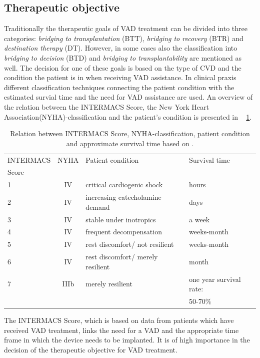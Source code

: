 \subsection{Therapeutic objective}
Traditionally the therapeutic goals of VAD treatment can be divided into three categories: \textit{bridging to transplantation} (BTT), \textit{bridging to recovery} (BTR) and \textit{destination therapy} (DT). However, in some cases also the classification into \textit{bridging to decision} (BTD) and \textit{bridging to transplantability} are mentioned as well. The decision for one of these goals is based on the type of CVD and the condition the patient is in when receiving VAD assistance. \cite{VAD6} In clinical praxis different classification techniques connecting the patient condition with the estimated survial time and the need for VAD assistance are used. An overview of the relation between the INTERMACS Score, the New York Heart Association(NYHA)-classification and the patient's condition is presented in \tablename~ \ref{tab:Table1}.
\begin{table}[ht]
  \begin{tabularx}{\textwidth}{l|c|l|l}
    \toprule
    INTERMACS & NYHA & Patient condition & Survival time  \\
    Score & & &\\
    \midrule
    1 & IV & critical cardiogenic shock & hours \\
    2 & IV & increasing catecholamine demand & days \\
    3 & IV & stable under inotropics & a week \\
    4 & IV & frequent decompensation & weeks-month \\
    5 & IV & rest discomfort/ not resilient & weeks-month \\
    6 & IV & rest discomfort/ merely resilient & month \\
    7 & IIIb & merely resilient & one year survival rate: \\
     & & & 50-70\% \\
     \bottomrule
  \end{tabularx}
  \caption[Relation between INTERMACS Score and NYHA-classification]{Relation between INTERMACS Score, NYHA-classification, patient condition and approximate survival time based on \cite{VAD5}.}
  \label{tab:Table1}
\end{table}
The INTERMACS Score, which is based on data from patients which have received VAD treatment, links the need for a VAD and the appropriate time frame in which the device needs to be implanted. It is of high importance in the decision of the therapeutic objective for VAD treatment. \cite{VAD7}

